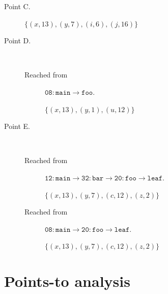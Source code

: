 \documentclass[letterpaper,11pt]{article}
\newcommand{\f}{\mathtt}
\begin{document}
\begin{description}
\begin{description}
      \item[Point C.]
        $\{ (x, 13), (y, 7), (i, 6), (j, 16) \}$

      \item[Point D.] ~

        \begin{description}
          \item[Reached from] $\f{08:main}\to\f{foo}$.

            $\{ (x, 13), (y, 1), (u, 12) \}$
        \end{description}

      \item[Point E.] ~

        \begin{description}
          \item[Reached from]
            $\f{12:main}\to\f{32:bar}\to\f{20:foo}\to\f{leaf}$.

            $\{ (x, 13), (y, 7), (c, 12), (z, 2) \}$

          \item[Reached from]
            $\f{08:main}\to\f{20:foo}\to\f{leaf}$.

            $\{ (x, 13), (y, 7), (c, 12), (z, 2) \}$
        \end{description}

    \end{description}

\end{description}

\section{Points-to analysis}
\end{document}
